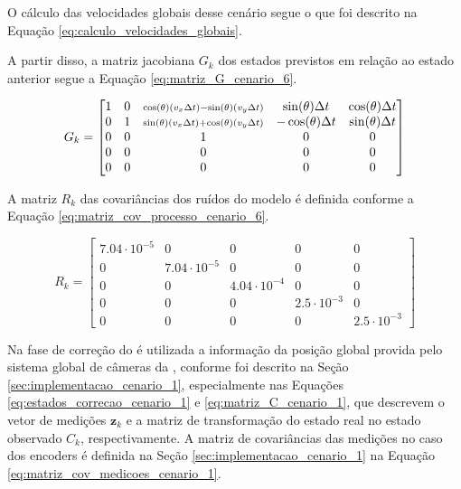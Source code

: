 \documentclass[acronym, symbols, table, deposito]{fei}
\begin{document}
			O cálculo das velocidades globais desse cenário segue o que foi descrito na Equação \eqref{eq:calculo_velocidades_globais}.
			
			A partir disso, a matriz jacobiana $G_{k}$ dos estados previstos em relação ao estado anterior segue a Equação \eqref{eq:matriz_G_cenario_6}.
			
			\renewcommand{\arraystretch}{1.2}
			\begin{equation}\label{eq:matriz_G_cenario_6}
				G_k = 
				\begin{bmatrix}
					1 & 0 & 
					\smash{\scriptstyle 
						\cos(\theta)\left( v_x \Delta t \right) 
						- \sin(\theta)\left( v_y \Delta t \right)} 
					& \sin(\theta) \Delta t 
					& \cos(\theta) \Delta t 
					\\
					0 & 1 & 
					\smash{\scriptstyle 
						\sin(\theta)\left( v_x \Delta t \right) 
						+ \cos(\theta)\left( v_y \Delta t \right)} 
					& -\cos(\theta) \Delta t 
					& \sin(\theta) \Delta t 
					\\
					0 & 0 & 1 & 0 & 0 \\
					0 & 0 & 0 & 0 & 0 \\
					0 & 0 & 0 & 0 & 0 \\
				\end{bmatrix}
			\end{equation}
		
			A matriz $R_k$ das covariâncias dos ruídos do modelo é definida conforme a Equação \eqref{eq:matriz_cov_processo_cenario_6}.
			
			\begin{equation}\label{eq:matriz_cov_processo_cenario_6}
				R_{k} = \begin{bmatrix}
					7.04\cdot10^{-5} & 0 & 0 & 0 & 0 \\
					0 & 7.04\cdot10^{-5} & 0 & 0 & 0 \\
					0 & 0 & 4.04\cdot10^{-4} & 0 & 0 \\
					0 & 0 & 0 & 2.5\cdot10^{-3} & 0 \\
					0 & 0 & 0 & 0 & 2.5\cdot10^{-3}
				\end{bmatrix}
			\end{equation}
		
			Na fase de correção do  é utilizada a informação da posição global provida pelo sistema global de câmeras da , conforme foi descrito na Seção \ref{sec:implementacao_cenario_1}, especialmente nas Equações \eqref{eq:estados_correcao_cenario_1} e \eqref{eq:matriz_C_cenario_1}, que descrevem o vetor de medições $\textbf{z}_{k}$ e a matriz de transformação do estado real no estado observado $C_{k}$, respectivamente. A matriz de covariâncias das medições no caso dos encoders é definida na Seção \ref{sec:implementacao_cenario_1} na Equação \eqref{eq:matriz_cov_medicoes_cenario_1}.
			
\end{document}
